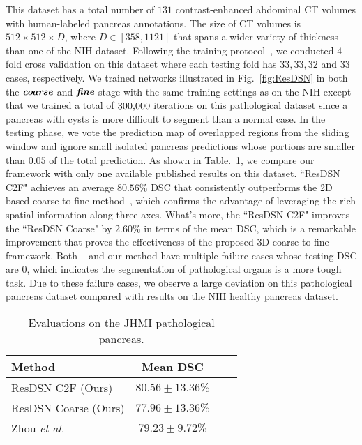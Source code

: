 \documentclass[10pt,twocolumn,letterpaper]{article}
\begin{document}
This dataset has a total number of $131$ contrast-enhanced abdominal CT volumes with human-labeled pancreas annotations. The size of CT volumes is $512\times512\times D$, where $D\in [358, 1121]$ that spans a wider variety of thickness than one of the NIH dataset. Following the training protocol~\cite{zhou2017deep}, we conducted $4$-fold cross validation on this dataset where each testing fold has $33, 33, 32$ and $33$ cases, respectively. We trained networks illustrated in Fig.~\ref{fig:ResDSN} in both the $\textit{\textbf{coarse}}$ and $\textit{\textbf{fine}}$ stage with the same training settings as on the NIH except that we trained a total of $300\rm{,}000$ iterations on this pathological dataset since a pancreas with cysts is more difficult to segment than a normal case. In the testing phase, we vote the prediction map of overlapped regions from the sliding window and ignore small isolated pancreas predictions whose portions are smaller than $0.05$ of the total prediction. As shown in Table.~\ref{Tab:JHUC2FSegmentation}, we compare our framework with only one available published results on this dataset. ``ResDSN C2F" achieves an average ${80.56\%}$ DSC that consistently outperforms the 2D based coarse-to-fine method~\cite{zhou2017deep}, which confirms the advantage of leveraging the rich spatial information along three axes. What's more, the ``ResDSN C2F" improves the ``ResDSN Coarse" by ${2.60\%}$ in terms of the mean DSC, which is a remarkable improvement that proves the effectiveness of the proposed 3D coarse-to-fine framework. Both ~\cite{zhou2017deep} and our method have multiple failure cases whose testing DSC are $0$, which indicates the segmentation of pathological organs is a more tough task. Due to these failure cases, we observe a large deviation on this pathological pancreas dataset compared with results on the NIH healthy pancreas dataset. 

 \begin{table}[htb]
 \footnotesize
 \begin{center}
 \begin{tabular}{lc l c}\toprule
 Method           & {Mean DSC} \\
 \hline
 {ResDSN C2F (Ours)}  		& $\bm{80.56\pm{13.36}}\%$ \\ 
 {ResDSN Coarse (Ours)}  		& $77.96\pm{13.36}\%$ \\
 \hline
 {Zhou \emph{et al.}~\cite{zhou2017deep}} 	& $79.23\pm{9.72}\%$\\
 \bottomrule
 \end{tabular}
 \end{center}
 \caption{
     Evaluations on the JHMI pathological pancreas. 
 }
 \label{Tab:JHUC2FSegmentation}
 \vspace{-0.2in}
 \end{table}
\end{document}
